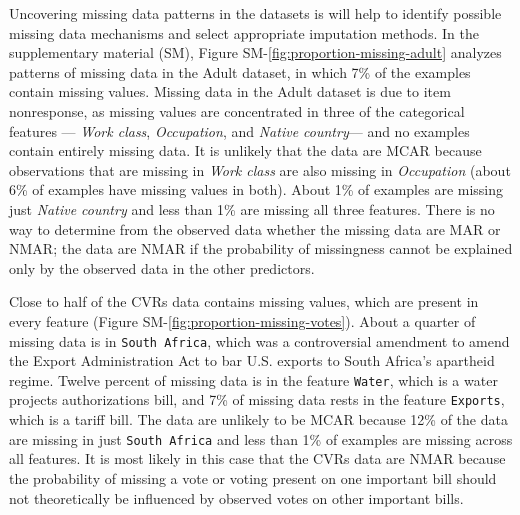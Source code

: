 \documentclass[10pt]{book}
\theoremstyle{definition}
\begin{document}
Uncovering missing data patterns in the datasets is will help to identify possible missing data mechanisms and select appropriate imputation methods. In the supplementary material (SM), Figure SM-\ref{fig:proportion-missing-adult} analyzes patterns of missing data in the Adult dataset, in which 7\% of the examples contain missing values. Missing data in the Adult dataset is due to item nonresponse, as missing values are concentrated in three of the categorical features --- \emph{Work class}, \emph{Occupation}, and \emph{Native country}--- and no examples contain entirely missing data. It is unlikely that the data are MCAR because observations that are missing in \emph{Work class} are also missing in \emph{Occupation} (about 6\% of examples have missing values in both). About 1\% of examples are missing just \emph{Native country} and less than 1\% are missing all three features. There is no way to determine from the observed data whether the missing data are MAR or NMAR; the data are NMAR if the probability of missingness cannot be explained only by the observed data in the other predictors.

Close to half of the CVRs data contains missing values, which are present in every feature (Figure SM-\ref{fig:proportion-missing-votes}). About a quarter of missing data is in \texttt{South Africa}, which was a controversial amendment to amend the Export Administration Act to bar U.S. exports to South Africa's apartheid regime. Twelve percent of missing data is in the feature \texttt{Water}, which is a water projects authorizations bill, and 7\% of missing data rests in the feature \texttt{Exports}, which is a tariff bill. The data are unlikely to be MCAR because 12\% of the data are missing in just \texttt{South Africa} and less than 1\% of examples are missing across all features. It is most likely in this case that the CVRs data are NMAR because the probability of missing a vote or voting present on one important bill should not theoretically be influenced by observed votes on other important bills. 

\par
{}
\end{document}
